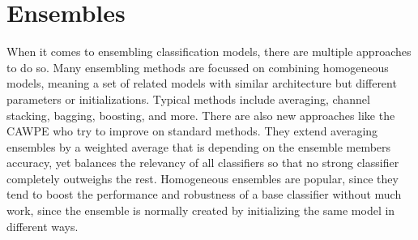 \section{Ensembles}
\label{sec:ensembles}

When it comes to ensembling classification models, there are multiple approaches to do so. Many ensembling methods are focussed on combining homogeneous 
models, meaning a set of related models with similar architecture but different parameters or initializations. Typical methods \cite{Opitz_1999ensemblebasics} include 
averaging, channel stacking, bagging, boosting, and more. There are also new approaches like the CAWPE \cite{Large_2019CAPE} who try to improve on standard methods. They extend averaging ensembles by 
a weighted average that is depending on the ensemble members accuracy, yet balances the relevancy of all classifiers so that no strong classifier completely outweighs the rest.\newline
Homogeneous ensembles are popular, since they tend to boost the performance and robustness of a base classifier without 
much work, since the ensemble is normally created by initializing the same model in different ways.

